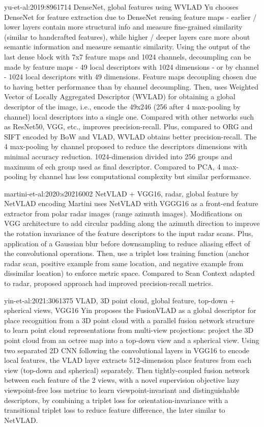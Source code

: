 yu-et-al:2019:8961714 DenseNet, global features using WVLAD
Yu chooses DenseNet for feature extraction due to DenseNet reusing feature maps - earlier / lower layers contain more structural info and measure fine-grained similarity (similar to handcrafted features), while higher / deeper layers care more about semantic information and measure semantic similarity. Using the output of the last dense block with 7x7 feature maps and 1024 channels, decoumpling can be made by feature maps - 49 local descriptors with 1024 dimensions - or by channel - 1024 local descriptors with 49 dimensions. Feature maps decoupling chosen due to having better performance than by channel decoumpling. Then, uses Weighted Vector of Locally Aggregated Descriptor (WVLAD) for obtaining a global descriptor of the image, i.e., encode the 49x246 (256 after 4 max-pooling by channel) local descriptors into a single one.
Compared with other networks such as ResNet50, VGG, etc., improves precision-recall. Plus, compared to ORG and SIFT encoded by BoW and VLAD, WVLAD obtains better precision-recall.
The 4 max-pooling by channel proposed to reduce the descriptors dimensions with minimal accuracy reduction. 1024-dimension divided into 256 groups and maximum of ech group used as final descriptor. Compared to PCA, 4 max-pooling by channel has less computational complexity but similar performance.

martini-et-al:2020:s20216002 NetVLAD + VGG16, radar, global feature by NetVLAD encoding
Martini uses NetVLAD with VGGG16 as a front-end feature extractor from polar radar images (range azimuth images). Modifications on VGG architecture to add circular padding along the azimuth direction to improve the rotation invariance of the feature descriptors to the input radar scans. Plus, application of a Gaussian blur before downsampling to reduce aliasing effect of the convolutional operations. Then, use a triplet loss training function (anchor radar scan, positive example from same location, and negative example from dissimilar location) to enforce metric space. Compared to Scan Context adapted to radar, proposed approach had improved precision-recall metrics.

yin-et-al:2021:3061375 VLAD, 3D point cloud, global feature, top-down + spherical views, VGG16
Yin proposes the FusionVLAD as a global descriptor for place recognition from a 3D point cloud with a parallel fusion network structure to learn point cloud representations from multi-view projections: project the 3D point cloud from an octree map into a top-down view and a spherical view. Using two separated 2D CNN following the convolutional layers in VGG16 to encode local features, the VLAD layer extracts 512-dimension place features from each view (top-down and spherical) separately. Then tightly-coupled fusion network between each feature of the 2 views, with a novel supervision objective lazy viewpoint-free loss metriuc to learn viewpoint-invariant and distinguishable descriptors, by combining a triplet loss for orientation-invariance with a transitional triplet loss to reduce feature difference, the later similar to NetVLAD.



